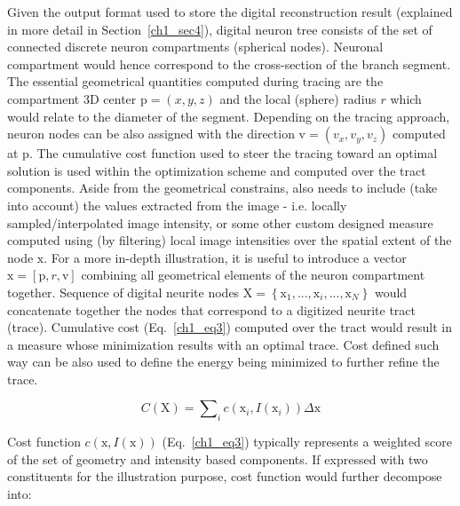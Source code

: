 Given the output format used to store the digital reconstruction result (explained in more detail in Section~\ref{ch1_sec4}), digital neuron tree consists of the set of connected discrete neuron compartments (spherical nodes). Neuronal compartment would hence correspond to the cross-section of the branch segment. The essential geometrical quantities computed during tracing are the compartment 3D center $\mathrm{p} = (x, y, z)$ and the local (sphere) radius $r$ which would relate to the diameter of the segment. Depending on the tracing approach, neuron nodes can be also assigned with the direction $ \mathrm{v} = ( v_x, v_y, v_z ) $ computed at $\mathrm{p}$. The cumulative cost function used to steer the tracing toward an optimal solution is used within the optimization scheme and computed over the tract components. Aside from the geometrical constrains, also needs to include (take into account) the values extracted from the image - i.e. locally sampled/interpolated image intensity, or some other custom designed measure computed using (by filtering) local image intensities over the spatial extent of the node $\mathrm{x}$. For a more in-depth illustration, it is useful to introduce a vector $\mathrm{x} = \left[  \mathrm{p}, r, \mathrm{v} \right] $ combining all geometrical elements of the neuron compartment together. Sequence of digital neurite nodes $\mathrm{X} = \left\lbrace \mathrm{x}_1, ... , \mathrm{x}_i, ..., \mathrm{x}_N \right\rbrace$ would concatenate together the nodes that correspond to a digitized neurite tract (trace). Cumulative cost (Eq.~\ref{ch1_eq3}) computed over the tract would result in a measure whose minimization results with an optimal trace. Cost defined such way can be also used to define the energy being minimized to further refine the trace.%


\begin{equation}
C(\mathrm{X}) = \sum\nolimits_{i} c(\mathrm{x}_i, I(\mathrm{x}_i)) \Delta\mathrm{x} 
\label{ch1_eq3}
\end{equation}

Cost function $ c( \mathrm{x}, I(\mathrm{x}) ) $ (Eq.~\ref{ch1_eq3}) typically represents a weighted score of the set of geometry and intensity based components. If expressed with two constituents for the illustration purpose, cost function would further decompose into:

